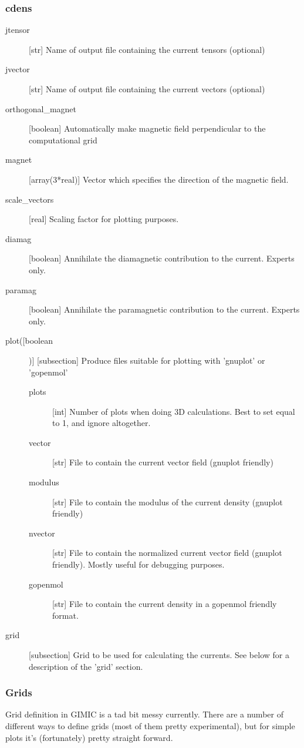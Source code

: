 \documentclass[a4paper,11pt]{article}
\begin{document}
\subsubsection{cdens}
\begin{description}
  \item[jtensor] [str] Name of output file  containing the current tensors
	(optional)
  \item[jvector] [str] Name of output file  containing the current vectors
	(optional)
  \item[orthogonal\_magnet] [boolean] Automatically make magnetic field
	perpendicular to the computational grid
  \item[magnet] [array(3*real)] Vector which specifies the direction of the
	magnetic field. 
  \item[scale\_vectors] [real] Scaling factor for plotting purposes.
  \item[diamag] [boolean] Annihilate the diamagnetic contribution to the
	current. Experts only.
  \item[paramag] [boolean] Annihilate the paramagnetic contribution to the
	current. Experts only.
  \item[plot([boolean])] [subsection] Produce files suitable for plotting with
	'gnuplot' or 'gopenmol'
	\begin{description}
	  \item[plots] [int] Number of plots when doing 3D calculations. Best to set
		equal to 1, and ignore altogether.
	  \item[vector] [str] File to contain the current vector field (gnuplot
		friendly)	
	  \item[modulus] [str] File to contain the modulus of the current density 
		(gnuplot friendly)
	  \item[nvector] [str] File to contain the normalized current vector field 
		(gnuplot friendly). Mostly useful for debugging purposes.
	  \item[gopenmol] [str] File to contain the current density in a gopenmol
		friendly format.
	\end{description}
  \item[grid] [subsection] Grid to be used for calculating the currents. See
	below for a description of the 'grid' section.
\end{description}

\subsubsection{Grids}
Grid definition in GIMIC is a tad bit messy currently. There are a number of
different ways to define grids (most of them pretty experimental), but for
simple plots it's (fortunately) pretty straight forward. 
\end{document}
